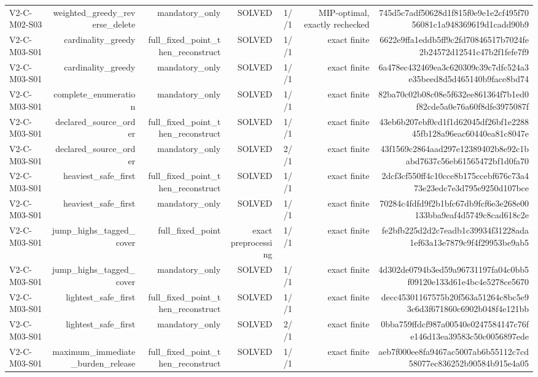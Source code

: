 {\begin{longtable}{lrrrrrr}
V2-C-M02-S03 & weighted\_greedy\_reverse\_delete & mandatory\_only & SOLVED & 1//1 & MIP-optimal, exactly rechecked & 745d5c7adf50628d1f815f0e9e1e2cf495f7056081c1a948369619d1cadd90b9 \\
V2-C-M03-S01 & cardinality\_greedy & full\_fixed\_point\_then\_reconstruct & SOLVED & 1//1 & exact finite & 6622e9ffa1eddb5ff9c2fd70846517b7024fe2b24572d12541c47b2f1fefe7f9 \\
V2-C-M03-S01 & cardinality\_greedy & mandatory\_only & SOLVED & 1//1 & exact finite & 6a478ec432469ea3c620309c39c7dfc524a3e35beed8d5d465140b9face8bd74 \\
V2-C-M03-S01 & complete\_enumeration & mandatory\_only & SOLVED & 1//1 & exact finite & 82ba70c02b08c08e5f632ee861364f7b1ed0f82cde5a0e76a60f8dfe3975087f \\
V2-C-M03-S01 & declared\_source\_order & full\_fixed\_point\_then\_reconstruct & SOLVED & 1//1 & exact finite & 43eb6b207ebf0cd1f1d62045df26bf1e228845fb128a96eac60440ea81c8047e \\
V2-C-M03-S01 & declared\_source\_order & mandatory\_only & SOLVED & 2//1 & exact finite & 43f1569c2864aad297e12389402b8e92c1babd7637c56eb61565472bf1d0fa70 \\
V2-C-M03-S01 & heaviest\_safe\_first & full\_fixed\_point\_then\_reconstruct & SOLVED & 1//1 & exact finite & 2dcf3cf550ff4c10cce8b175ccebf676c73a473e23edc7e3d795e9250d107bce \\
V2-C-M03-S01 & heaviest\_safe\_first & mandatory\_only & SOLVED & 1//1 & exact finite & 70284c4fdfd9f2b1bfc67db9fcf6e3e268e00133bba9eaf4d5749c8cad618c2e \\
V2-C-M03-S01 & jump\_highs\_tagged\_cover & full\_fixed\_point & exact preprocessing & 1//1 & exact finite & fe2bfb225d2d2c7eadb1c39934f31228ada1ef63a13e7879c9f4f29953be9ab5 \\
V2-C-M03-S01 & jump\_highs\_tagged\_cover & mandatory\_only & SOLVED & 1//1 & exact finite & 4d302de0794b3ed59a96731197fa04c0bb5f09120e133d61e4bc4e5278ce5670 \\
V2-C-M03-S01 & lightest\_safe\_first & full\_fixed\_point\_then\_reconstruct & SOLVED & 1//1 & exact finite & decc45301167575b20f563a51264c8bc5e93c6d3f671860c6902b048f4e121bb \\
V2-C-M03-S01 & lightest\_safe\_first & mandatory\_only & SOLVED & 2//1 & exact finite & 0bba759ffdcf987a00540e0247584147c76fe146d13ea39583c50c0056897ede \\
V2-C-M03-S01 & maximum\_immediate\_burden\_release & full\_fixed\_point\_then\_reconstruct & SOLVED & 1//1 & exact finite & aeb7f000ee8fa9467ac5007ab6b55112c7cd58077ec836252b90584b915e4a05 \\

\end{longtable}}
